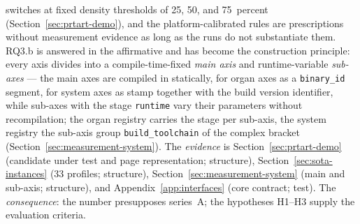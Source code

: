 \begin{nurlang}
switches at fixed density thresholds of 25, 50, and 75~percent (Section~\ref{sec:prtart-demo}),
and the platform-calibrated rules are prescriptions without measurement evidence as long as the
runs do not substantiate them. RQ3.b is answered in the affirmative and has become the
construction principle: every axis divides into a compile-time-fixed \emph{main axis} and
runtime-variable \emph{sub-axes} --- the main axes are compiled in statically, for organ axes as a
\texttt{binary\_id} segment, for system axes as stamp together with the build version identifier,
while sub-axes with the stage \texttt{runtime} vary their parameters without recompilation; the
organ registry carries the stage per sub-axis, the system registry the sub-axis group
\texttt{build\_toolchain} of the complex bracket (Section~\ref{sec:measurement-system}). The
\emph{evidence} is Section~\ref{sec:prtart-demo} (candidate under test and page representation; structure),
Section~\ref{sec:sota-instances} (33 profiles; structure), Section~\ref{sec:measurement-system}
(main and sub-axis; structure), and Appendix~\ref{app:interfaces} (core contract; test). The
\emph{consequence}: the number presupposes series~A\@; the hypotheses H1--H3 supply the evaluation
criteria.
\end{nurlang}
